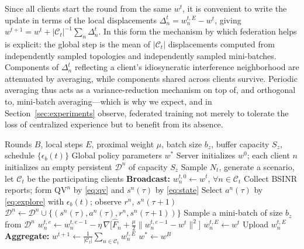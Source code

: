 \documentclass[journal]{IEEEtran}
\newcommand{\OURS}{\textsc{Carlton\,FL}}
\begin{document}
Since all clients start the round from the same $w^{t}$, it is convenient to
write the update in terms of the local displacements
$\Delta_{n}^{t} = w^{t,E}_{n} - w^{t}$, giving
$w^{t+1} = w^{t} + |\mathcal{C}_{t}|^{-1}\sum_{n} \Delta_{n}^{t}$. In this form
the mechanism by which federation helps is explicit: the global step is the
mean of $|\mathcal{C}_{t}|$ displacements computed from independently sampled
topologies and independently sampled mini-batches. Components of
$\Delta^{t}_{n}$ reflecting a client's idiosyncratic interference neighborhood
are attenuated by averaging, while components shared across clients survive.
Periodic averaging thus acts as a variance-reduction mechanism on top of, and
orthogonal to, mini-batch averaging---which is why we expect, and in
Section~\ref{sec:experiments} observe, federated training not merely to
tolerate the loss of centralized experience but to benefit from its absence.

\begin{algorithm}[!t]
\caption{\OURS{} training procedure}
\label{alg:frl}
\begin{algorithmic}[1]
\Require Rounds $B$, local steps $E$, proximal weight $\mu$, batch size
         $b_{z}$, buffer capacity $S_{z}$, schedule $\{\epsilon_{b}(t)\}$
\Ensure  Global policy parameters $w^{*}$
\State Server initializes $w^{0}$; each client $n$ initializes an empty
       persistent $\mathcal{D}^{n}$ of capacity $S_{z}$
  \State Sample $N_{t}$, generate a scenario, let $\mathcal{C}_{t}$ be the
         participating clients
  \State \textbf{Broadcast:} $w^{t,0}_{n} \gets w^{t}$,\;
         $\forall n \in \mathcal{C}_{t}$
      \State Collect BSINR reports; form $\mathrm{QV}^{n}$ by \eqref{eq:qv} and
             $s^{n}(\tau)$ by \eqref{eq:state}
      \State Select $a^{n}(\tau)$ by \eqref{eq:explore} with $\epsilon_{b}(t)$;
             observe $r^{n}$, $s^{n}(\tau{+}1)$
      \State $\mathcal{D}^{n} \gets \mathcal{D}^{n} \cup
             \{(s^{n}(\tau),a^{n}(\tau),r^{n},s^{n}(\tau{+}1))\}$
    \EndFor
  \EndFor
        \State Sample a mini-batch of size $b_{z}$ from $\mathcal{D}^{n}$
        \State $w^{t,e}_{n} \gets w^{t,e-1}_{n} - \eta\,\nabla
               \bigl[\widehat{F}_{n} + \tfrac{\mu}{2}
               \lVert w^{t,e-1}_{n} - w^{t}\rVert^{2}\bigr]$
      \EndFor
    \Else
      \State $w^{t,E}_{n} \gets w^{t}$
    \EndIf
    \State Upload $w^{t,E}_{n}$
  \EndFor
  \State \textbf{Aggregate:} $w^{t+1} \gets
         \frac{1}{|\mathcal{C}_{t}|}\sum_{n \in \mathcal{C}_{t}} w^{t,E}_{n}$
\EndFor
\State \Return $w^{*} \gets w^{B}$
\end{algorithmic}
\end{algorithm}
\end{document}
